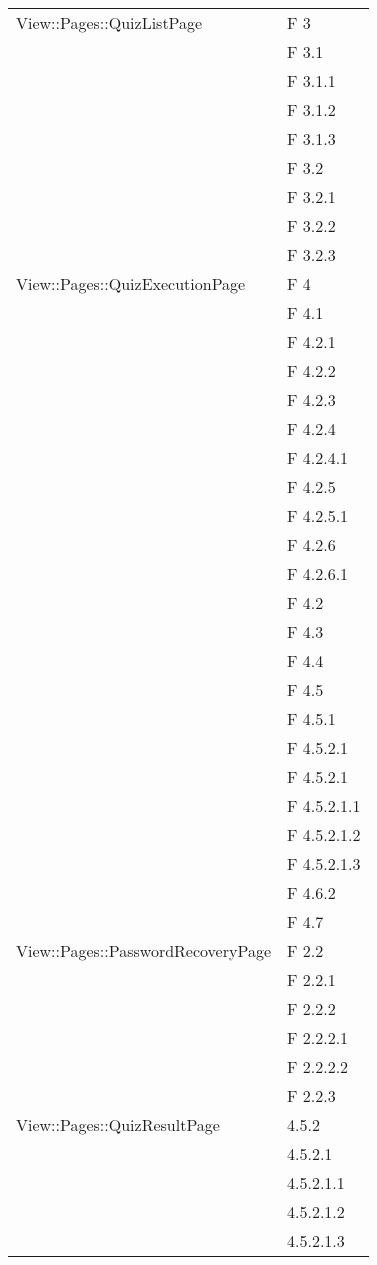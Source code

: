 \begin{longtable}{p{}p{}}
\midrule
View::Pages::QuizListPage					& F 3\\
								& F 3.1\\
								& F 3.1.1\\
								& F 3.1.2\\
								& F 3.1.3\\
								& F 3.2\\
								& F 3.2.1\\
								& F 3.2.2\\
								& F 3.2.3\\
								
\midrule
View::Pages::QuizExecutionPage	& F 4\\
								& F 4.1\\
								& F 4.2.1\\
								& F 4.2.2\\
								& F 4.2.3\\
								& F 4.2.4\\
								& F 4.2.4.1\\
								& F 4.2.5\\
								& F 4.2.5.1\\
								& F 4.2.6\\
								& F 4.2.6.1\\
								& F 4.2\\
								& F 4.3\\
								& F 4.4\\
								& F 4.5\\
								& F 4.5.1\\
								& F 4.5.2.1\\
								& F 4.5.2.1\\
								& F 4.5.2.1.1\\
								& F 4.5.2.1.2\\
								& F 4.5.2.1.3\\
								& F 4.6.2\\
& F 4.7\\

\midrule
View::Pages::PasswordRecoveryPage	& F 2.2\\
								& F 2.2.1\\
								& F 2.2.2\\
								& F 2.2.2.1\\
								& F 2.2.2.2\\
								& F 2.2.3\\

\midrule
View::Pages::QuizResultPage	& 4.5.2\\
								& 4.5.2.1\\
								& 4.5.2.1.1\\
								& 4.5.2.1.2\\
								& 4.5.2.1.3\\	
							

\end{longtable}
